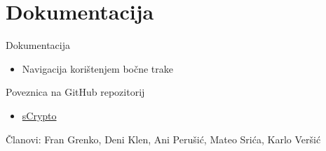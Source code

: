 \documentclass[aspectratio=169,xcolor=dvipsnames]{beamer}
\begin{document}
\section{Dokumentacija}
\begin{frame}{Dokumentacija}
    \begin{itemize}
        \item Navigacija korištenjem bočne trake
    \end{itemize}
\end{frame}


\begin{frame}{Poveznica na GitHub repozitorij}
    \begin{itemize}
        \item \href{https://github.com/MSrica/sCrypto}{sCrypto}\newline
    \end{itemize}
    Članovi: Fran Grenko, Deni Klen, Ani Perušić, Mateo Srića, Karlo Veršić
\end{frame}
\end{document}
